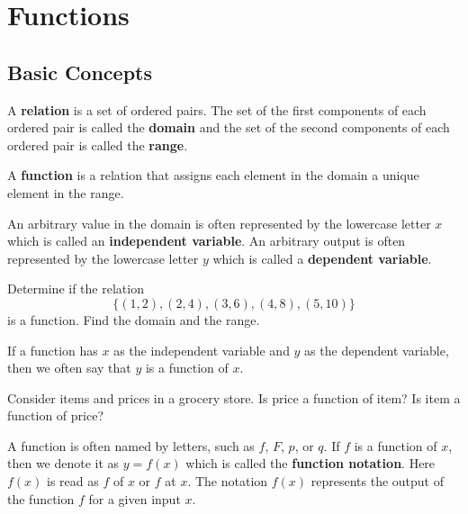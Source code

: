 
\chapter{Functions}
\thispagestyle{chpg}

\section{Basic Concepts}
\begin{definition}
  A \textbf{relation} is a set of ordered pairs. The set of the first components of each ordered pair is called the \textbf{domain} and the set of the second components of each ordered pair is called the \textbf{range}.

  A \textbf{function} is a relation that assigns each element in the domain a unique element in the range.

  An arbitrary value in the domain is often represented by the lowercase letter $x$ which is called an \textbf{independent variable}.
  An arbitrary output is often represented by the lowercase letter $y$ which is called a \textbf{dependent variable}.
  
\end{definition}

\begin{example}
  Determine if the relation 
  \[\{(1,2),(2,4),(3,6),(4,8),(5,10)\}\]
  is a function. Find the domain and the range.
\end{example}

\begin{definition}
  If a function has $x$ as the independent variable and $y$ as the dependent variable, then we often say that $y$ is a function of $x$.
\end{definition}

\begin{example}
  Consider items and prices in a grocery store. Is price a function of item? Is item a function of price? 
\end{example}

\begin{definition}
  A function is often named by letters, such as $f$, $F$, $p$, or $q$. If $f$ is a function of $x$, then we denote it as $y=f(x)$ which is called the \textbf{function notation}. Here $f(x)$ is read as $f$ of $x$ or $f$ at $x$. The notation $f(x)$ represents the output of the function $f$ for a given input $x$.
\end{definition}
  
